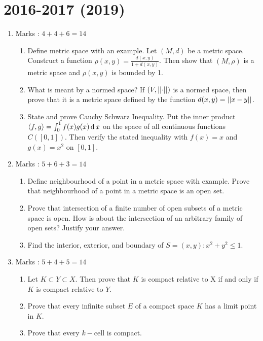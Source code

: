 \documentclass[../main-sheet.tex]{subfiles}
\begin{document}
\section*{2016-2017 (2019)}
    \begin{enumerate}
        \item Marks : $ 4+4+6=14 $
              \begin{enumerate}
                  \item Define metric space with an example. Let $ (M,d) $ be a metric space. Construct a function $ \rho(x,y)=\frac{d(x,y)}{1+d(x,y)}  $. Then show that $ (M, \rho) $ is a metric space and $ \rho(x, y) $ is bounded by 1.
                  \item What is meant by a normed space? If $ (V, \left\vert\left\vert\cdot\right\vert\right\vert) $ is a normed space, then prove that it is a metric space defined by the function $ d(x, y) = \left\vert\left\vert x - y\right\vert\right\vert $.
                  \item State and prove Cauchy Schwarz Inequality. Put the inner product $ \left<f,g \right>= \int_0^1 f (x) g(x)\,\mathrm{d}\, x  $ on the space of all continuous functions $ C([0,1]) $. Then verify the stated inequality with $ f(x) = x $ and $ g(x) = x^2 $ on $ [0,1] $.
            \end{enumerate}
        \item Marks : $ 5+6+3=14 $
              \begin{enumerate}
                  \item Define neighbourhood of a point in a metric space with example. Prove that neighbourhood of a point in a metric space is an open set.
                  \item Prove that intersection of a finite number of open subsets of a metric space is open. How is about the intersection of an arbitrary family of open sets? Justify your answer.
                  \item Find the interior, exterior, and boundary of $ S = {(x, y): x^2 + y^2 \leq 1} $.
            \end{enumerate}
        \item Marks : $ 5+4+5=14 $
              \begin{enumerate}
                  \item Let $ K \subset Y \subset X $. Then prove that $ K $ is compact relative to X if and only if $ K $ is compact relative to $ Y $.
                  \item Prove that every infinite subset $ E $ of a compact space $ K $ has a limit point in $ K $.
                  \item Prove that every $ k- $cell is compact.

\end{enumerate}
\end{enumerate}
\end{document}
